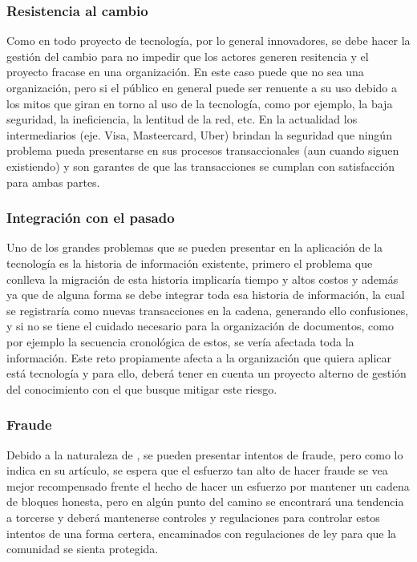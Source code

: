 \subsubsection{Resistencia al cambio}
Como en todo proyecto de tecnología, por lo general innovadores, se debe hacer la gestión del cambio para no impedir que los actores generen resitencia y el proyecto fracase en una organización. En este caso puede que no sea una organización, pero si el público en general puede ser renuente a su uso debido a los mitos que giran en torno al uso de la tecnología, como por ejemplo, la baja seguridad, la ineficiencia, la lentitud de la red, etc. En la actualidad los intermediarios (eje. Visa, Masteercard, Uber)\citep{crosby2016blockchain} brindan la seguridad que ningún problema pueda presentarse en sus procesos transaccionales (aun cuando siguen existiendo) y son garantes de que las transacciones se cumplan con satisfacción para ambas partes. 

\subsubsection{Integración con el pasado}
Uno de los grandes problemas que se pueden presentar en la aplicación de la tecnología es la historia de información existente, primero el problema que conlleva la migración de esta historia implicaría tiempo y altos costos \citep{crosby2016blockchain} y además ya que de alguna forma se debe integrar toda esa historia de información, la cual se registraría como nuevas transacciones en la cadena, generando ello confusiones, y si no se tiene el cuidado necesario para la organización de documentos, como por ejemplo la secuencia cronológica de estos, se vería afectada toda la información. Este reto propiamente afecta a la organización que quiera aplicar está tecnología y para ello, deberá tener en cuenta un proyecto alterno de  gestión del conocimiento con el que busque mitigar este riesgo.

\subsubsection{Fraude}
Debido a la naturaleza de \blckchn, se pueden presentar intentos de fraude, pero como lo indica \citep{nakamoto2009bitcoin} en su artículo, se espera que el esfuerzo tan alto de hacer fraude se vea mejor recompensado frente el hecho de hacer un esfuerzo por mantener un cadena de bloques honesta, pero en algún punto del camino se encontrará una tendencia a torcerse y deberá mantenerse controles y regulaciones para controlar estos intentos de una forma certera, encaminados con regulaciones de ley para que la comunidad se sienta protegida.

